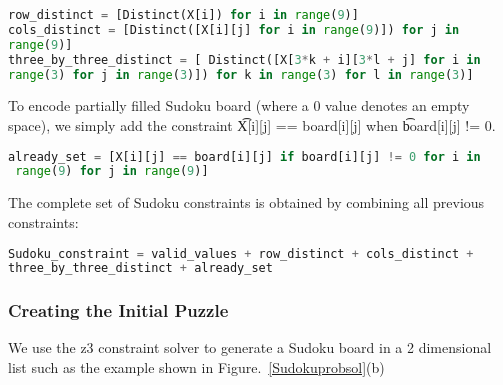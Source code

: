 \singlespace
\begin{lstlisting}[language=python, frame = single]
row_distinct = [Distinct(X[i]) for i in range(9)]
cols_distinct = [Distinct([X[i][j] for i in range(9)]) for j in
range(9)] 
three_by_three_distinct = [ Distinct([X[3*k + i][3*l + j] for i in
range(3) for j in range(3)]) for k in range(3) for l in range(3)]

\end{lstlisting}
\doublespace

To encode partially filled Sudoku board (where a 0 value denotes an
empty space), we simply add the constraint \t{X[i][j] == board[i][j]} when
\t{board[i][j]} != 0. 

\singlespace
\begin{lstlisting}[language=python, frame = single]
 already_set = [X[i][j] == board[i][j] if board[i][j] != 0 for i in
 range(9) for j in range(9)]

\end{lstlisting}
\doublespace

The complete set of Sudoku constraints is obtained by
combining all previous constraints:

\singlespace
\begin{lstlisting}[language=python, frame = single]
Sudoku_constraint = valid_values + row_distinct + cols_distinct +
three_by_three_distinct + already_set
\end{lstlisting}
\doublespace


\subsubsection*{Creating the Initial Puzzle}
We use the z3 constraint solver to generate a Sudoku board in a 2
dimensional list such as the example shown in Figure.~\ref{Sudokuprobsol}(b)%

